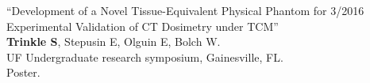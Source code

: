 \documentclass[10pt,letterpaper]{article}
\begin{document}
\begin{benumerate}{17}
\item{``Development of a Novel Tissue-Equivalent Physical Phantom for \hfill 3/2016\\
    Experimental Validation of CT Dosimetry under TCM'' \\
    \textbf{Trinkle S}, Stepusin E, Olguin E, Bolch W.\\
    UF Undergraduate research symposium, Gainesville, FL. \\
    Poster.}

\end{benumerate}





  
\end{document}

